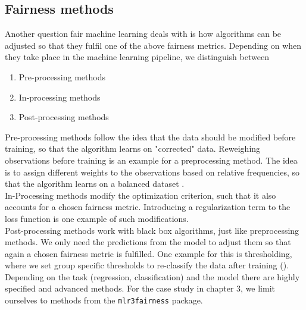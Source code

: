\subsection{Fairness methods}
Another question fair machine learning deals with is how algorithms can be adjusted so that they fulfil one of the above fairness metrics.
Depending on when they take place in the machine learning pipeline, we distinguish between
\begin{enumerate}
    \item Pre-processing methods
    \item In-processing methods
    \item Post-processing methods
\end{enumerate}
Pre-processing methods follow the idea that the data should be modified before training, so that the algorithm learns on "corrected" data. Reweighing observations before training is an example for a preprocessing method. The idea is to assign different weights to the observations based on relative frequencies, so that the algorithm learns on a balanced dataset \cite{caton2024}.\\
In-Processing methods modify the optimization criterion, such that it also accounts for a chosen fairness metric. Introducing a regularization term to the loss function is one example of such modifications.\\
Post-processing methods work with black box algorithms, just like preprocessing methods. We only need the predictions from the model to adjust them so that again a chosen fairness metric is fulfilled. One example for this is thresholding, where we set group specific thresholds to re-classify the data after training (\cite{hardt2016}).
Depending on the task (regression, classification) and the model there are highly specified and advanced methods. For the case study in chapter 3, we limit ourselves to methods from the \texttt{mlr3fairness} package.

